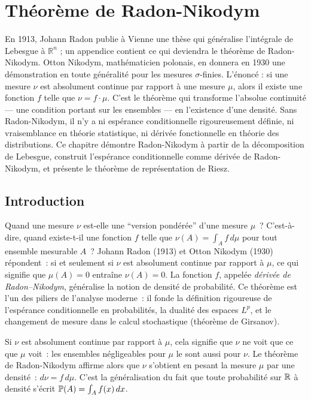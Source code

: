 \chapter{Th\'eor\`eme de Radon-Nikodym}
\label{ch:radon_nikodym}

En 1913, Johann Radon publie à Vienne une thèse qui généralise l'intégrale de Lebesgue à $\mathbb{R}^n$ ; un appendice contient ce qui deviendra le théorème de Radon-Nikodym. Otton Nikodym, mathématicien polonais, en donnera en 1930 une démonstration en toute généralité pour les mesures $\sigma$-finies. L'énoncé : si une mesure $\nu$ est absolument continue par rapport à une mesure $\mu$, alors il existe une fonction $f$ telle que $\nu = f\cdot\mu$. C'est le théorème qui transforme l'absolue continuité --- une condition portant sur les ensembles --- en l'existence d'une densité. Sans Radon-Nikodym, il n'y a ni espérance conditionnelle rigoureusement définie, ni vraisemblance en théorie statistique, ni dérivée fonctionnelle en théorie des distributions. Ce chapitre démontre Radon-Nikodym à partir de la décomposition de Lebesgue, construit l'espérance conditionnelle comme dérivée de Radon-Nikodym, et présente le théorème de représentation de Riesz.

\section{Introduction}

Quand une mesure $\nu$ est-elle une ``version pond\'er\'ee'' d'une mesure $\mu$~? C'est-\`a-dire, quand existe-t-il une fonction $f$ telle que $\nu(A) = \int_A f\, d\mu$ pour tout ensemble mesurable $A$~? Johann Radon (1913) et Otton Nikodym (1930) r\'epondent~: si et seulement si $\nu$ est absolument continue par rapport \`a $\mu$, ce qui signifie que $\mu(A) = 0$ entra\^ine $\nu(A) = 0$. La fonction $f$, appel\'ee \emph{d\'eriv\'ee de Radon--Nikodym}, g\'en\'eralise la notion de densit\'e de probabilit\'e. Ce th\'eor\`eme est l'un des piliers de l'analyse moderne~: il fonde la d\'efinition rigoureuse de l'esp\'erance conditionnelle en probabilit\'es, la dualit\'e des espaces $L^p$, et le changement de mesure dans le calcul stochastique (th\'eor\`eme de Girsanov).

\begin{intuition}[title=\textbf{Radon-Nikodym~: changer de r\'ef\'erentiel}]
Si $\nu$ est absolument continue par rapport \`a $\mu$, cela signifie que $\nu$ ne
\og voit \fg que ce que $\mu$ voit~: les ensembles n\'egligeables pour $\mu$ le sont
aussi pour $\nu$. Le th\'eor\`eme de Radon-Nikodym affirme alors que $\nu$ s'obtient
en \og pesant \fg la mesure $\mu$ par une densit\'e~: $d\nu = f\, d\mu$.
C'est la g\'en\'eralisation du fait que toute probabilit\'e sur $\mathbb{R}$ \`a densit\'e
s'\'ecrit $\mathbb{P}(A) = \int_A f(x)\, dx$.
\end{intuition}

